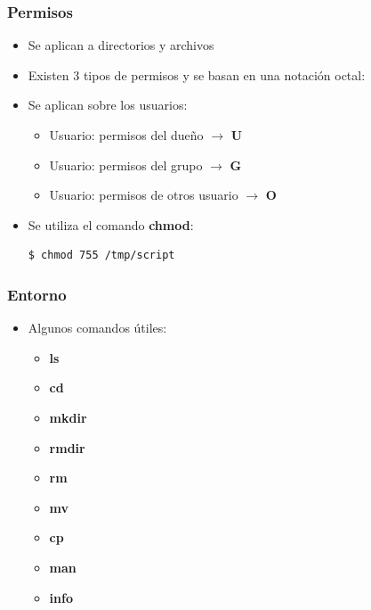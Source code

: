 \begin{frame}[fragile]
  \frametitle{Permisos}
  \begin{itemize}
	  	\item Se aplican a directorios y archivos
	  	\item Existen 3 tipos de permisos y se basan en una notación octal:
	  	\begin{table}
		      \centering
		\end{table}
		\item Se aplican sobre los usuarios:
		\begin{itemize}
			\item Usuario: permisos del dueño $\rightarrow$ \textbf{U}
			\item Usuario: permisos del grupo $\rightarrow$ \textbf{G}
			\item Usuario: permisos de otros usuario $\rightarrow$ \textbf{O}
		\end{itemize}
		\item Se utiliza el comando \textbf{chmod}:
		\begin{lstlisting}
$ chmod 755 /tmp/script
		\end{lstlisting}
  \end{itemize}
\end{frame}

\begin{frame}
  \frametitle{Entorno}
  \begin{itemize}
	  \item Algunos comandos útiles:
	  \begin{itemize}
	  	\item \textbf{ls}

	  	\item \textbf{cd}

	  	\item \textbf{mkdir}

	  	\item \textbf{rmdir}

	  	\item \textbf{rm}

	  	\item \textbf{mv}

	  	\item \textbf{cp}

	  	\item \textbf{man}
	  	
	  	\item \textbf{info}
	  \end{itemize}
  \end{itemize}
\end{frame}

